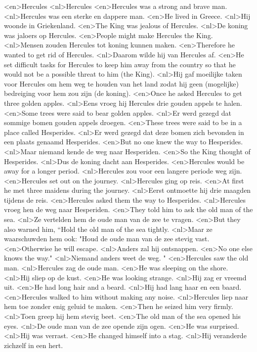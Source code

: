 <en>Hercules
<nl>Hercules
<en>Hercules was a strong and brave man.
<nl>Hercules was een sterke en dappere man.
<en>He lived in Greece.
<nl>Hij woonde in Griekenland.
<en>The King was jealous of Hercules.
<nl>De koning was jaloers op Hercules.
<en>People might make Hercules the King.
<nl>Mensen zouden Hercules tot koning kunnen maken.
<en>Therefore he wanted to get rid of Hercules.
<nl>Daarom wilde hij van Hercules af.
<en>He set difficult tasks for Hercules to keep him away from the country so that he would not be a possible threat to him (the King).
<nl>Hij gaf moeilijke taken voor Hercules om hem weg te houden van het land zodat hij geen (mogelijke) bedreiging voor hem zou zijn (de koning).
<en>Once he asked Hercules to get three golden apples.
<nl>Eens vroeg hij Hercules  drie gouden appels te halen.
<en>Some trees were said to bear golden apples.
<nl>Er werd gezegd dat  sommige bomen gouden appels droegen.
<en>These trees were said to be in a place called Hesperides.
<nl>Er werd  gezegd dat deze bomen zich  bevonden in een plaats genaamd Hesperides.
<en>But no one knew the way to Hesperides.
<nl>Maar niemand kende de weg naar Hesperiden.
<en>So the King thought of Hesperides.
<nl>Dus de koning dacht aan Hesperides.
<en>Hercules would be away for a longer period.
<nl>Hercules zou voor een langere periode weg zijn.
<en>Hercules set out on the journey.
<nl>Hercules ging op reis.
<en>At first he met three maidens during the journey.
<nl>Eerst ontmoette hij drie maagden tijdens de reis.
<en>Hercules asked them the way to Hesperides.
<nl>Hercules vroeg hen de weg naar Hesperiden.
<en>They told him to ask the old man of the sea.
<nl>Ze vertelden hem de oude man van de zee te vragen.
<en>But they also warned him, “Hold the old man of the sea tightly.
<nl>Maar ze waarschuwden hem ook: "Houd de oude man van de zee stevig vast.
<en>Otherwise he will escape.
<nl>Anders zal hij ontsnappen.
<en>No one else knows the way."
<nl>Niemand anders weet de weg. "
<en>Hercules saw the old man.
<nl>Hercules zag de oude man.
<en>He was sleeping on the shore.
<nl>Hij sliep op de kust.
<en>He was looking strange.
<nl>Hij zag er vreemd uit.
<en>He had long hair and a beard.
<nl>Hij had lang haar en een baard.
<en>Hercules walked to him without making any noise.
<nl>Hercules liep naar hem toe zonder enig geluid te maken.
<en>Then he seized him very firmly.
<nl>Toen greep hij hem stevig beet.
<en>The old man of the sea opened his eyes.
<nl>De oude man van de zee opende zijn ogen.
<en>He was surprised.
<nl>Hij was verrast.
<en>He changed himself into a stag.
<nl>Hij veranderde zichzelf in een hert.
